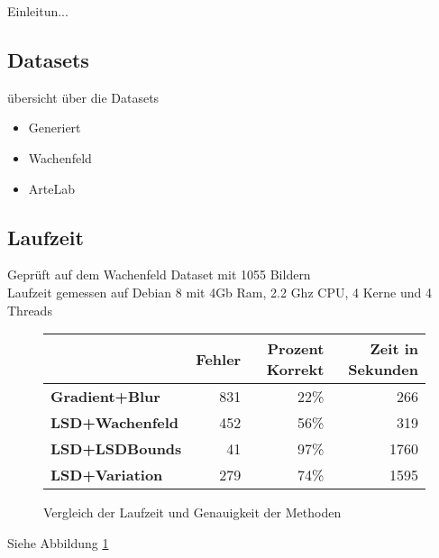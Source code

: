 Einleitun...
\subsection{Datasets}
übersicht über die Datasets
\begin{itemize}
\item Generiert
\item Wachenfeld \cite{wachenfeld2008robust}
\item ArteLab \cite{zamberletti2010neural} \cite{zamberletti2013robust}
\end{itemize}
\subsection{Laufzeit}
Geprüft auf dem Wachenfeld Dataset mit 1055 Bildern \cite{wachenfeld2008robust}\\
Laufzeit gemessen auf Debian 8 mit 4Gb Ram, 2.2 Ghz CPU, 4 Kerne und 4 Threads

\begin{figure}[t]
\center
\begin{tabular}{|l|r|r|r|}
\hline
&\textbf{Fehler}&\textbf{Prozent Korrekt}&\textbf{Zeit in Sekunden}\\
\hline
\textbf{Gradient+Blur}& 831& 22\%& 266\\
\hline
\textbf{LSD+Wachenfeld}& 452& 56\%& 319\\
\hline
\textbf{LSD+LSDBounds}& 41& 97\%& 1760\\
\hline
\textbf{LSD+Variation}& 279& 74\%& 1595\\
\hline
\end{tabular}
\caption{Vergleich der Laufzeit und Genauigkeit der Methoden}
\label{laufzeit}
\end{figure}
Siehe Abbildung \ref{laufzeit}
 